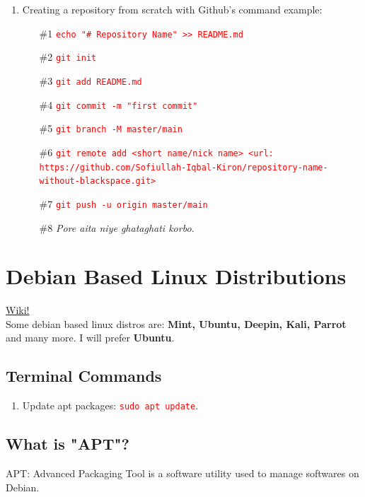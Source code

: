 \documentclass[12 pt, letterpaper]{extarticle}
\newcommand{\R}{\textcolor{red}} %
\newcommand{\T}{\texttt}
\begin{document}
\begin{enumerate}
	\item Creating a repository from scratch with Github's command example:
	      \begin{enumerate}
		      \item[\#1] \R{\T{echo "\# Repository Name" >> README.md}}
		      \item[\#2] \R{\T{git init}}
		      \item[\#3] \R{\T{git add README.md}}
		      \item[\#4] \R{\T{git commit -m "first commit"}}
		      \item[\#5] \R{\T{git branch -M master/main}}
		      \item[\#6] \R{\T{\footnotesize git remote add <short name/nick name> <url:\\https://github.com/Sofiullah-Iqbal-Kiron/repository-name-without-blackspace.git>}}
		      \item[\#7] \R{\T{git push -u origin master/main}}
		      \item[\#8] \textit{Pore aita niye ghataghati korbo.}
	      \end{enumerate}

\end{enumerate}


\section*{Debian Based Linux Distributions}

\href{https://en.wikipedia.org/wiki/Debian}{Wiki!} \\
Some debian based linux distros are: \textbf{Mint, Ubuntu, Deepin, Kali, Parrot} and many more. I will prefer \textbf{Ubuntu}.

\subsection*{Terminal Commands}
\begin{enumerate}
	\item Update apt packages: \R{\T{sudo apt update}}.
\end{enumerate}

\subsection*{What is "APT"?}
APT: Advanced Packaging Tool is a software utility used to manage softwares on Debian.
\end{document}

